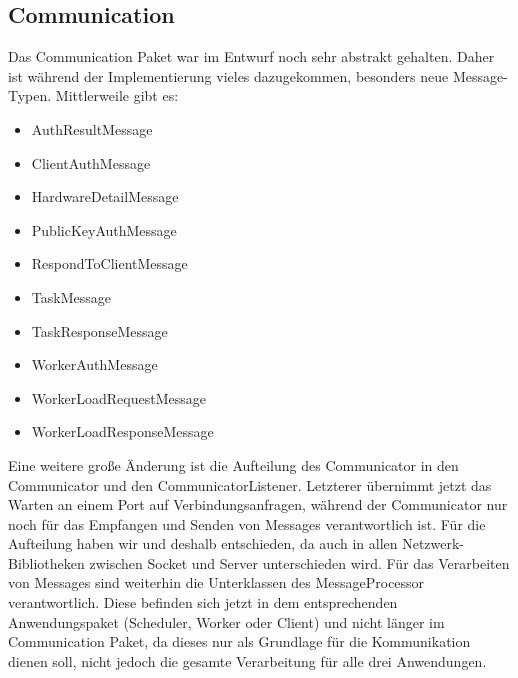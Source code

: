 \documentclass[a4paper,12pt]{article}
\begin{document}
\subsection{Communication}
\vspace{0.2cm}
Das Communication Paket war im Entwurf noch sehr abstrakt gehalten. Daher ist während der Implementierung vieles dazugekommen, besonders neue Message-Typen. Mittlerweile gibt es:
\begin{itemize}
	\item AuthResultMessage
	\item ClientAuthMessage
	\item HardwareDetailMessage
	\item PublicKeyAuthMessage
	\item RespondToClientMessage
	\item TaskMessage
	\item TaskResponseMessage
	\item WorkerAuthMessage
	\item WorkerLoadRequestMessage
	\item WorkerLoadResponseMessage
\end{itemize}
Eine weitere große Änderung ist die Aufteilung des Communicator in den Communicator und den CommunicatorListener. Letzterer übernimmt jetzt das Warten an einem Port auf Verbindungsanfragen, während der Communicator nur noch für das Empfangen und Senden von Messages verantwortlich ist. Für die Aufteilung haben wir und deshalb entschieden, da auch in allen Netzwerk-Bibliotheken zwischen Socket und Server unterschieden wird. Für das Verarbeiten von Messages sind weiterhin die Unterklassen des MessageProcessor verantwortlich. Diese befinden sich jetzt in dem entsprechenden Anwendungspaket (Scheduler, Worker oder Client) und nicht länger im Communication Paket, da dieses nur als Grundlage für die Kommunikation dienen soll, nicht jedoch die gesamte Verarbeitung für alle drei Anwendungen.

\clearpage
\end{document}
